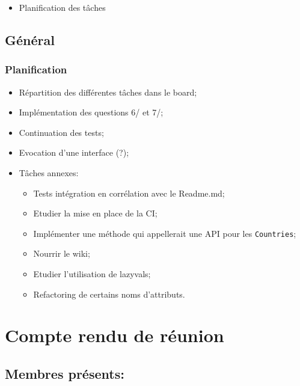 \documentclass[a4paper, 12pt]{report}
\begin{document}
\begin{itemize}

\item
  Planification des tâches
\end{itemize}

\subsection*{Général}

\subsubsection*{Planification}

\begin{itemize}

\item
  Répartition des différentes tâches dans le board;
\item
  Implémentation des questions 6/ et 7/;
\item
  Continuation des tests;
\item
  Evocation d'une interface (?);
\item
  Tâches annexes:

  \begin{itemize}
  
  \item
    Tests intégration en corrélation avec le Readme.md;
  \item
    Etudier la mise en place de la CI;
  \item
    Implémenter une méthode qui appellerait une API pour les
    \texttt{Countries};
  \item
    Nourrir le wiki;
  \item
    Etudier l'utilisation de lazyvals;
  \item
    Refactoring de certains noms d'attributs.
  \end{itemize}
\end{itemize}


\section{Compte rendu de réunion }

\subsection*{Membres présents:}
\end{document}
